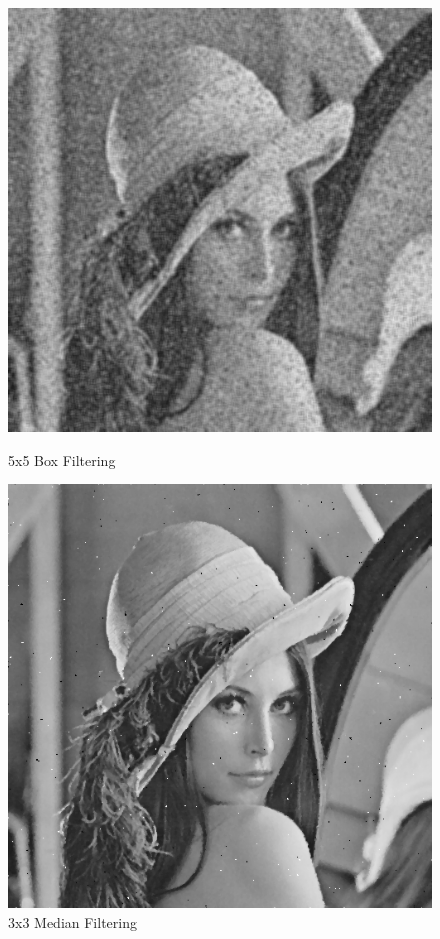 \documentclass{article}
\begin{document}
\begin{figure}[H]
  \includegraphics[width=\linewidth]{img/snp10_box_5x5.png}
  \caption{5x5 Box Filtering}\label{fig:snp10_box_5x5}
\endminipage\hfill
{}
  \includegraphics[width=\linewidth]{img/snp10_median_3x3.png}
  \caption{3x3 Median Filtering}\label{fig:snp10_median_3x3}
\endminipage\hfill
\end{figure}
\end{document}
